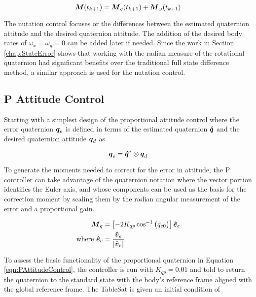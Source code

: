 \begin{equation}
    \boldsymbol{M}(t_{k+1}) = \boldsymbol{M}_{q}(t_{k+1}) + \boldsymbol{M}_{\omega}(t_{k+1})
\end{equation}

The nutation control focuses or the differences between the estimated quaternion attitude and the desired quaternion attitude.  The addition of the desired body rates of $\omega_x = \omega_y = 0$ can be added later if needed.  Since the work in Section \ref{chap:StateError} shows that working with the radian measure of the rotational quaternion had significant benefits over the traditional full state difference method, a similar approach is used for the nutation control.




\subsection{P Attitude Control}
\label{subsec:PAttitudeControl}

Starting with a simplest design of the proportional attitude control where the error quaternion $\boldsymbol{q}_e$ is defined in terms of the estimated quaternion $\boldsymbol{\hat{q}}$ and the desired quaternion attitude $\boldsymbol{q}_d$ as

\begin{equation}
  \boldsymbol{q}_e = \boldsymbol{\hat{q}}^* \otimes \boldsymbol{q}_d
\end{equation}

To generate the moments needed to correct for the error in attitude, the P controller can take advantage of the quaternion notation where the vector portion identifies the Euler axis, and whose components can be used as the basis for the correction moment by scaling them by the radian angular measurement of the error and a proportional gain.

\begin{subequations}
  \begin{align}
    \boldsymbol{M}_{q} &= \left[-2 K_{qp} \cos^{-1} \big(\hat{q}_{e0} \big) \right] \boldsymbol{\hat{e}}_e \\
    \text{where } \boldsymbol{\hat{e}}_e &= \frac{\boldsymbol{\hat{v}}_e}{|\boldsymbol{\hat{v}}_e|}
  \end{align}
  \label{eqn:PAttitudeControl}
\end{subequations}

To assess the basic functionality of the proportional quaternion in Equation \ref{eqn:PAttitudeControl}, the controller is run with $K_{qp} = 0.01$ and told to return the quaternion to the standard state with the body's reference frame aligned with the global reference frame.  The TableSat is given an initial condition of

